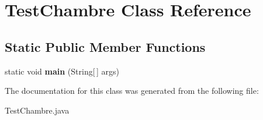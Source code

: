 \hypertarget{class_test_chambre}{}\section{Test\+Chambre Class Reference}
\label{class_test_chambre}
\subsection*{Static Public Member Functions}
\begin{DoxyCompactItemize}
\item 
static void {\bfseries main} (String\mbox{[}$\,$\mbox{]} args)\hypertarget{class_test_chambre_a2959dea40e040c91a122a46d0b626878}{}\label{class_test_chambre_a2959dea40e040c91a122a46d0b626878}

\end{DoxyCompactItemize}


The documentation for this class was generated from the following file\+:\begin{DoxyCompactItemize}
\item 
Test\+Chambre.\+java\end{DoxyCompactItemize}
